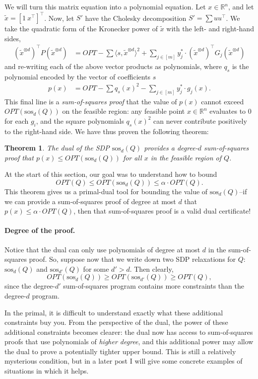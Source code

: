 \documentclass[a4paper,11pt]{article}
\newcommand{\R}{\mathbb{R}}
\newcommand{\sos}{\mathrm{sos}}
\newtheorem{theorem}{Theorem}
\theoremstyle{definition}
\begin{document}
We will turn this matrix equation into a polynomial equation.
Let $x \in \R^n$, and let $\tilde{x} = [1 \ x^{\top}]^\top$.
Now, let $S'$ have the Cholesky decomposition $S' =\sum uu^{\top}$.
We take the quadratic form of the Kronecker power of $\tilde{x}$ with the left- and right-hand sides,
\begin{align*}
(\tilde{x}^{\otimes d})^{\top} P (\tilde{x}^{\otimes d})
&= OPT - \sum \langle s, \tilde{x}^{\otimes d}\rangle^2 + \sum_{j\in[m]} y_j^* \cdot  (\tilde{x}^{\otimes d})^{\top} G_j (\tilde{x}^{\otimes d})
\end{align*}
and re-writing each of the above vector products as polynomials, where $q_s$ is the polynomial encoded by the vector of coefficients $s$
\begin{align*}
p(x)
&= OPT -\sum q_s(x)^2 - \sum_{j\in[m]} y_j^* \cdot g_j(x).
\end{align*}
This final line is a {\em sum-of-squares proof} that the value of $p(x)$ cannot exceed $OPT(\sos_d(Q))$ on the feasible region: any feasible point $x \in \R^n$ evaluates to $0$ for each $g_i$, and the square polynomials $q_s(x)^2$ can never contribute positively to the right-hand side.
We have thus proven the following theorem:
\begin{theorem}
The dual of the SDP $\sos_d(Q)$ provides a degree-$d$ sum-of-squares proof that $p(x) \le OPT(\sos_d(Q))$ for all $x$ in the feasible region of $Q$.
\end{theorem}

At the start of this section, our goal was to understand how to bound
\[
OPT(Q) \le OPT(\sos_d(Q)) \le \alpha \cdot OPT(Q).
\]
This theorem gives us a primal-dual tool for bounding the value of $\sos_d(Q)$--{if we can provide a sum-of-squares proof of degree at most $d$ that $p(x) \le \alpha\cdot OPT(Q)$, then that sum-of-squares proof is a valid dual certificate!}

\paragraph{Degree of the proof.}
Notice that the dual can only use polynomials of degree at most $d$ in the sum-of-squares proof.
So, suppose now that we write down two SDP relaxations for $Q$: $\sos_d(Q)$ and $\sos_{d'}(Q)$ for some $d' > d$.
Then clearly,
\[
OPT(\sos_{d}(Q)) \ge OPT(\sos_{d'}(Q)) \ge OPT(Q),
\]
since the degree-$d'$ sum-of-squares program contains more constraints than the degree-$d$ program.

In the primal, it is difficult to understand exactly what these additional constraints buy you.
From the perspective of the dual, the power of these additional constraints becomes clearer: the dual now has access to sum-of-squares proofs that use polynomials of {\em higher degree}, and this additional power may allow the dual to prove a potentially tighter upper bound.
This is still a relatively mysterious condition, but in a later post I will give some concrete examples of situations in which it helps.
\end{document}
